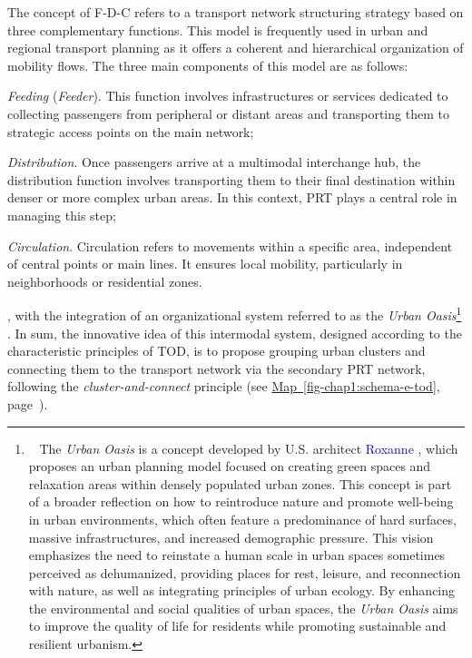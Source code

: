 \begin{refsegment}
{    The concept of \acrfull{F-D-C} refers to a transport network structuring strategy based on three complementary functions. This model is frequently used in urban and regional transport planning as it offers a coherent and hierarchical organization of mobility flows. The three main components of this model are as follows:
        \begin{customitemize}
    \item \textsl{Feeding} (\textsl{Feeder}). This function involves infrastructures or services dedicated to collecting passengers from peripheral or distant areas and transporting them to strategic access points on the main network;
    \item \textsl{Distribution}. Once passengers arrive at a multimodal interchange hub, the distribution function involves transporting them to their final destination within denser or more complex urban areas. In this context, \acrshort{PRT} plays a central role in managing this step;
    \item \textsl{Circulation}. Circulation refers to movements within a specific area, independent of central points or main lines. It ensures local mobility, particularly in neighborhoods or residential zones.
        \end{customitemize}
}, with the integration of an organizational system referred to as the \textsl{Urban Oasis}\footnote{~
    The \textsl{Urban Oasis} is a concept developed by U.S. architect \textcolor{blue}{Roxanne} \textcolor{blue}{\textcite{warren_urban_1997}}, which proposes an urban planning model focused on creating green spaces and relaxation areas within densely populated urban zones. This concept is part of a broader reflection on how to reintroduce nature and promote well-being in urban environments, which often feature a predominance of hard surfaces, massive infrastructures, and increased demographic pressure. This vision emphasizes the need to reinstate a human scale in urban spaces sometimes perceived as dehumanized, providing places for rest, leisure, and reconnection with nature, as well as integrating principles of urban ecology. By enhancing the environmental and social qualities of urban spaces, the \textsl{Urban Oasis} aims to improve the quality of life for residents while promoting sustainable and resilient urbanism.
} \textcolor{blue}{\autocite[145]{schneider_prt_1992}}. In sum, the innovative idea of this intermodal system, designed according to the characteristic principles of \acrshort{TOD}, is to propose grouping urban clusters and connecting them to the transport network via the secondary \acrshort{PRT} network, following the \textsl{cluster-and-connect} principle (see \hyperref[fig-chap1:schema-e-tod]{Map~\ref{fig-chap1:schema-e-tod}}, page~\pageref{fig-chap1:schema-e-tod}).%


\end{refsegment}
